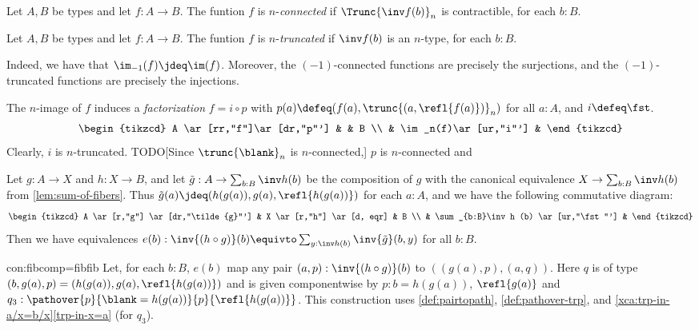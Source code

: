 \begin{definition}\label{def:n-connected}
  Let $A,B$ be types and let $f : A \to B$. The funtion $f$ is $n$-\emph{connected}
  if $\Trunc{\inv f (b)}_n$ is contractible, for each $b:B$.
\end{definition}

\begin{definition}\label{def:n-truncated}
  Let $A,B$ be types and let $f : A \to B$. The funtion $f$ is $n$-\emph{truncated}
  if $\inv f (b)$ is an $n$-type, for each $b:B$.
\end{definition}

Indeed, we have that $\im_{-1}(f) \jdeq \im(f)$. Moreover,
the $(-1)$-connected functions are precisely the surjections,
and the $(-1)$-truncated functions are precisely the injections.

  The $n$-image of $f$
  induces a \emph{factorization} $f = i\circ p$ with
  $p(a)\defeq (f(a),\trunc{(a,\refl{f(a)})}_n)$ for all $a:A$, and $i\defeq\fst$.
  \[
    \begin{tikzcd}
      A \ar[rr,"f"]\ar[dr,"p"'] & & B \\
      & \im_n(f)\ar[ur,"i"'] &
    \end{tikzcd}
  \]
Clearly, $i$ is $n$-truncated. TODO[Since $\trunc{\blank}_n$ is $n$-connected,] $p$ is $n$-connected and

\begin{construction}\label{con:fibcomp=fibfib}
  Let $g:A\to X$ and $h: X\to B$, and let 
$\tilde{g}:A\to \sum_{b:B}\inv h (b)$ be the composition of $g$
with the canonical equivalence $X\to \sum_{b:B}\inv h (b)$ from \cref{lem:sum-of-fibers}.
Thus $\tilde{g}(a)\jdeq (h(g(a)),g(a),\refl{h(g(a))})$ for each $a:A$,
and we have the following commutative diagram:
  \[
    \begin{tikzcd}
      A \ar[r,"g"] \ar[dr,"\tilde{g}"'] & X \ar[r,"h"] \ar[d, eqr] & B \\
      & \sum_{b:B}\inv h (b) \ar[ur,"\fst"'] &
    \end{tikzcd}
  \]
Then we have equivalences $e(b) : \inv {(h\circ g)} (b) \equivto \sum_{y:\inv h (b)} \inv {\tilde{g}}(b,y)$
for all $b:B$.
\end{construction}
\begin{implementation}{con:fibcomp=fibfib}
Let, for each $b:B$, $e(b)$ map any pair $(a,p):\inv {(h\circ g)} (b)$ to 
$((g(a),p),(a,q))$. Here $q$ is of type $(b,g(a),p) = (h(g(a)),g(a),\refl{h(g(a))})$
and is given componentwise by $p: b=h(g(a))$, $\refl{g(a)}$ and 
$q_3: \pathover {p}{\blank=h(g(a))}{p} {\refl{h(g(a))}}$.
This construction uses \cref{def:pairtopath}, \cref{def:pathover-trp},
and \cref{xca:trp-in-a/x=b/x}\ref{trp-in-x=a} (for $q_3$).
\end{implementation}

